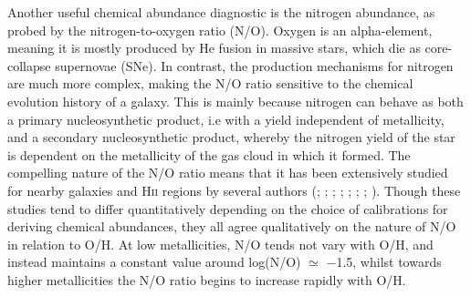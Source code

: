 \documentclass[usenatbib]{mnras} %
\begin{document}
Another useful chemical abundance diagnostic is the nitrogen abundance, as probed by the nitrogen-to-oxygen ratio (N/O). Oxygen is an alpha-element, meaning it is mostly produced by He fusion in massive stars, which die as core-collapse supernovae (SNe). In contrast, the production mechanisms for nitrogen are much more complex, making the N/O ratio sensitive to the chemical evolution history of a galaxy. This is mainly because nitrogen can behave as both a primary nucleosynthetic product, i.e with a yield independent of metallicity, and a secondary nucleosynthetic product, whereby the nitrogen yield of the star is dependent on the metallicity of the gas cloud in which it formed. The compelling nature of the N/O ratio means that it has been extensively studied for nearby galaxies and \textsc{Hii} regions by several authors (\citealt{Shields_1991}; \citealt{VilaCostas_1993}; \citealt{vanZee_1998}; \citealt{HenryWorthy_1999}; \citealt{PMC_2009}; \citealt{Perez-Montero_2013}; \citealt{Pilyugin_2012}; \citealt{AndrewsMartini_2013}). Though these studies tend to differ quantitatively depending on the choice of calibrations for deriving chemical abundances, they all agree qualitatively on the nature of N/O in relation to O/H. At low metallicities, N/O tends not vary with O/H, and instead maintains a constant value around log(N/O) $\simeq$ $-$1.5, whilst towards higher metallicities the N/O ratio begins to increase rapidly with O/H. 


\end{document}
